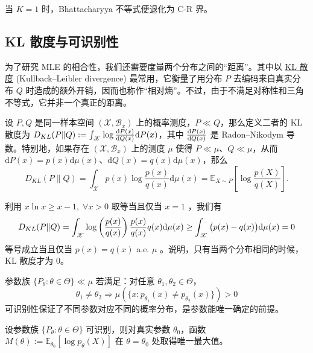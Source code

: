 当 $K=1$ 时，Bhattacharyya 不等式便退化为 C-R 界。

\subsection{KL 散度与可识别性}

为了研究 MLE 的相合性，我们还需要度量两个分布之间的``距离''。其中以 \href{https://en.wikipedia.org/wiki/Kullback\%E2\%80\%93Leibler_divergence}{KL 散度} (Kullback--Leibler divergence) 最常用，它衡量了用分布 $P$ 去编码来自真实分布 $Q$ 时造成的额外开销，因而也称作``相对熵''。不过，由于不满足对称性和三角不等式，它并非一个真正的距离。

\begin{definition*}[KL 散度]
设 $P,Q$ 是同一样本空间 $(\mathscr X,\mathscr B_x)$ 上的概率测度，$P\ll Q$，那么定义二者的 KL 散度为 $D_{KL}(P\|Q):=\int_{\mathscr X}\log\frac{{\rm d}P(x)}{{\rm d}Q(x)}\mathrm{d}P(x)$，其中 $\tfrac{{\rm d}P(x)}{{\rm d}Q(x)}$ 是 Radon--Nikodym 导数。特别地，如果存在 $(\mathscr X,\mathscr B_x)$ 上的测度 $\mu$ 使得 $P\ll\mu$、$Q\ll\mu$，从而 $\mathrm{d}P(x)=p(x)\mathrm{d}\mu(x)$、$\mathrm{d}Q(x)=q(x)\mathrm{d}\mu(x)$，那么 
$$D_{KL}(P\|Q)=\int_{\mathscr X}p(x)\log\frac{p(x)}{q(x)}\mathrm{d}\mu(x)=\mathbb{E}_{X\sim P}\left[\log\frac{p(X)}{q(X)}\right].$$
\end{definition*}

利用 $x\ln x\ge x-1,\;\forall x>0$ 取等当且仅当 $x=1$ ，我们有\[ D_{KL}(P\|Q)=\int_{\mathscr X}\log\left(\frac{p(x)}{q(x)}\right)\frac{p(x)}{q(x)}q(x){\rm d}\mu(x)\ge \int_{\mathscr X}\big(p(x)-q(x)\big)\mathrm{d}\mu(x)=0 \]
等号成立当且仅当 $p(x)=q(x)$ a.e. $\mu$ 。说明，只有当两个分布相同的时候，KL 散度才为 0。

\begin{definition*}[可识别性]
参数族 $\{P_\theta:\theta\in\Theta\}\ll\mu$ 若满足：对任意 $\theta_1,\theta_2\in\Theta$，
\[\theta_1 \neq \theta_2 \Longrightarrow \mu(\{x: p_{\theta_1}(x) \neq p_{\theta_2}(x)\}) > 0\]
可识别性保证了不同参数对应不同的概率分布，是参数能唯一确定的前提。
\end{definition*}

\begin{lemma}[最小化 KL 散度]
\label{lem:ch7:kl-minimization}

设参数族 $\{P_\theta : \theta \in \Theta\}$ 可识别，则对真实参数 $\theta_0$，函数 $M(\theta) := \mathbb{E}_{\theta_0}[\log p_\theta(X)]$ 在 $\theta = \theta_0$ 处取得唯一最大值。

\end{lemma}

